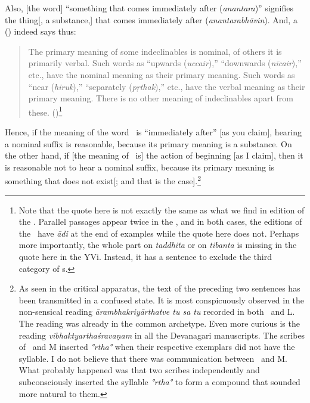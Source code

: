 Also,%
 [the word] ``something that comes immediately after (\emph{anantara})''  signifies the thing[, a substance,] that comes immediately after (\emph{anantarabhāvin}).  %
% 
And, %
a \smrti\/ (\VMBh) indeed says thus:
\begin{quote}
  The primary meaning of some indeclinables is nominal, of others it
  is primarily verbal.  Such words as ``upwards (\emph{uccair}),''
  ``downwards (\emph{nīcair}),'' etc., have the nominal meaning as
  their primary meaning.  Such words as ``near (\emph{hiruk}),''
  ``separately (\emph{pṛthak}),'' etc., have the verbal meaning as their
  primary meaning.  There is no other meaning of indeclinables apart from these. ()\footnote{Note that the quote here is not exactly the same as what we find in edition of the \VMBh. Parallel passages appear twice in the \VMBh, and in both cases, the editions of the \VMBh\ have \emph{ādi} at the end of examples while the quote here does not. Perhaps more importantly, the whole part on \emph{taddhita} or on \emph{tibanta} is missing in the quote here in the YVi. Instead, it has a sentence to exclude the third category of \avyaya s.}
\end{quote}
Hence, if the meaning of the word \atha\ is ``immediately after'' [as you
claim], hearing a nominal suffix is reasonable, because its primary
meaning is a substance.  On the other hand, if [the meaning of \atha\ is] the action of beginning [as I claim], then it is reasonable not to hear
a nominal suffix, because its primary meaning is something that does not
exist[; and that is the case].\footnote{As seen in the critical apparatus, the text of the preceding two sentences has been transmitted in a confused state.  It is most conspicuously observed in the non-sensical reading \emph{ārambhakriyārthatve tu sa tu} recorded in both \Tm\ and L\@.  The reading was already in the common archetype.  Even more curious is the reading \emph{vibhaktyarthaśravaṇam} in all the Devanagari manuscripts.  The scribes of \Td\ and M inserted \emph{°rtha°} when their respective exemplars did not have the syllable.  I do not believe that there was communication between \Td\ and M\@.  What probably happened was that two scribes independently and subconsciously inserted the syllable \emph{°rtha°} to form a compound that sounded more natural to them.}

